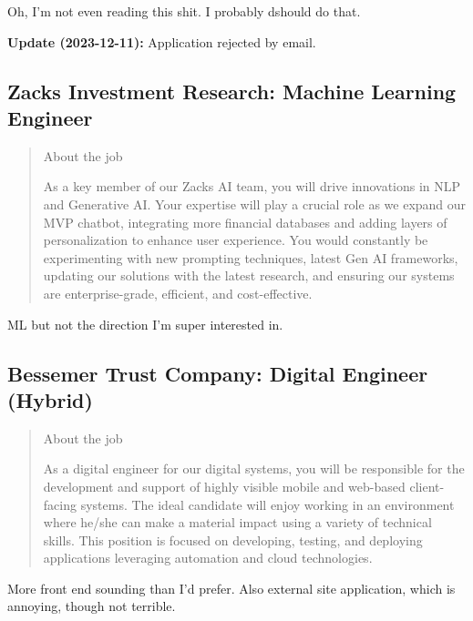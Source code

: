 \documentclass[
	letterpaper, %
	12pt, %
]{CSSullivanBusinessReport}
\begin{document}
Oh, I'm not even reading this shit. I probably dshould do that. 

\textbf{Update (2023-12-11):} Application rejected by email.


\subsection[Zacks Investment Research]{Zacks Investment Research: Machine Learning Engineer}

\begin{quote}
	About the job
	
	As a key member of our Zacks AI team, you will drive innovations in NLP and Generative AI. Your expertise will play a crucial role as we expand our MVP chatbot, integrating more financial databases and adding layers of personalization to enhance user experience. You would constantly be experimenting with new prompting techniques, latest Gen AI frameworks, updating our solutions with the latest research, and ensuring our systems are enterprise-grade, efficient, and cost-effective.

\end{quote}

ML but not the direction I'm super interested in. 



\subsection[Bessemer Trust Company]{Bessemer Trust Company: Digital Engineer (Hybrid)}

\begin{quote}
	About the job
	
	As a digital engineer for our digital systems, you will be responsible for the development and support of highly visible mobile and web-based client-facing systems. The ideal candidate will enjoy working in an environment where he/she can make a material impact using a variety of technical skills. This position is focused on developing, testing, and deploying applications leveraging automation and cloud technologies.

\end{quote}

More front end sounding than I'd prefer. Also external site application, which is annoying, though not terrible. 
\end{document}
